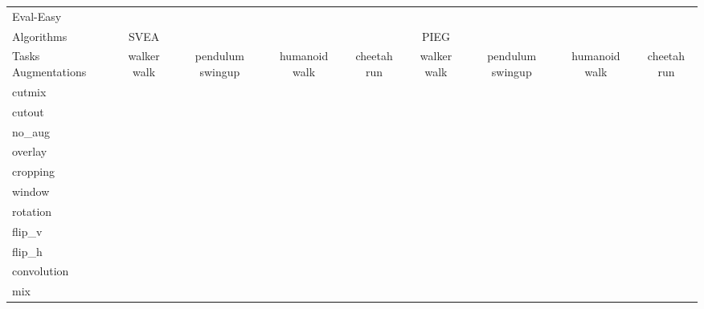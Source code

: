 \begin{tabular}{lcccccccc}
Eval-Easy & & & & & & & & \\
Algorithms & SVEA & & & & PIEG & & & \\
Tasks Augmentations & walker walk & pendulum swingup & humanoid walk & cheetah run & walker walk & pendulum swingup & humanoid walk & cheetah run \\
cutmix          &  &  &  &  &  &  &  &  \\
cutout          &  &  &  &  &  &  &  &  \\
no\_aug         &  &  &  &  &  &  &  &  \\
overlay         &  &  &  &  &  &  &  &  \\
cropping        &  &  &  &  &  &  &  &  \\
window          &  &  &  &  &  &  &  &  \\
rotation        &  &  &  &  &  &  &  &  \\
flip\_v         &  &  &  &  &  &  &  &  \\
flip\_h         &  &  &  &  &  &  &  &  \\
convolution     &  &  &  &  &  &  &  &  \\
mix             &  &  &  &  &  &  &  &  \\
\end{tabular}